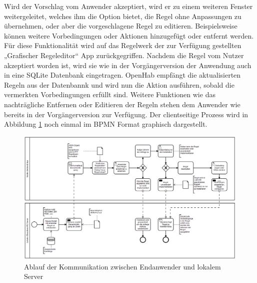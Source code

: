 Wird der Vorschlag vom Anwender akzeptiert, wird er zu einem weiteren Fenster weitergeleitet, welches ihm die Option bietet, die Regel ohne Anpassungen zu übernehmen, oder aber die vorgeschlagene Regel zu editieren. Beispielsweise können weitere Vorbedingungen oder Aktionen hinzugefügt oder entfernt werden. Für diese Funktionalität wird auf das Regelwerk der zur Verfügung gestellten „Grafischer Regeleditor“ App zurückgegriffen. 
Nachdem die Regel vom Nutzer akzeptiert worden ist, wird sie wie in der Vorgängerversion der Anwendung auch in eine SQLite Datenbank eingetragen. OpenHab empfängt die aktualisierten Regeln aus der Datenbannk und wird nun die Aktion ausführen, sobald die vermerkten Vorbedingungen erfüllt sind.
Weitere Funktionen wie das nachträgliche Entfernen oder Editieren der Regeln stehen dem Anwender wie bereits in der Vorgängerversion zur Verfügung.
Der clientseitige Prozess wird in Abbildung \ref{fig:Kommunikationsablauf} noch einmal im BPMN Format graphisch dargestellt.
\newpage
\begin{figure}[!ht]
    \centering
    \includegraphics[width= 1.47\textwidth, angle=90,origin=c]{figures/Appbildungen/diagramm_app.PNG}
    \caption{Ablauf der Kommunikation zwischen Endanwender und lokalem Server}
    \label{fig:Kommunikationsablauf}
\end{figure}